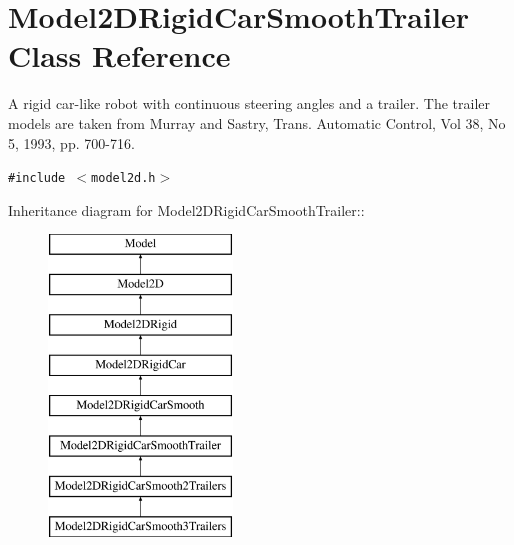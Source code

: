 \section{Model2DRigid\-Car\-Smooth\-Trailer  Class Reference}
\label{class_Model2DRigidCarSmoothTrailer}
A rigid car-like robot with continuous steering angles and a trailer. The trailer models are taken from Murray and Sastry, Trans. Automatic Control, Vol 38, No 5, 1993, pp. 700-716. 


{\tt \#include $<$model2d.h$>$}

Inheritance diagram for Model2DRigid\-Car\-Smooth\-Trailer::\begin{figure}[H]
\begin{center}
\leavevmode
\includegraphics[height=8cm]{class_Model2DRigidCarSmoothTrailer}
\end{center}
\end{figure}
